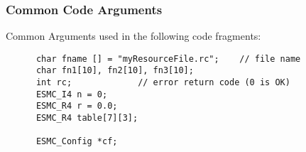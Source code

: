  
\setlength{\oldparskip}{\parskip}
\setlength{\parskip}{1.5ex}
\setlength{\oldparindent}{\parindent}
\setlength{\parindent}{0pt}
\setlength{\oldbaselineskip}{\baselineskip}
\setlength{\baselineskip}{11pt}
 
\def\bv{\begin{verbatim}}
\def\ev{\end{verbatim}}
\def\be{\begin{equation}}
\def\ee{\end{equation}}
\def\bea{\begin{eqnarray}}
\def\eea{\end{eqnarray}}
\def\bi{\begin{itemize}}
\def\ei{\end{itemize}}
\def\bn{\begin{enumerate}}
\def\en{\end{enumerate}}
\def\bd{\begin{description}}
\def\ed{\end{description}}
\def\({\left (}
\def\){\right )}
\def\[{\left [}
\def\]{\right ]}
\def\<{\left  \langle}
\def\>{\right \rangle}
\def\cI{{\cal I}}
\def\diag{\mathop{\rm diag}}
\def\tr{\mathop{\rm tr}}


 

  \subsubsection{Common Code Arguments}
 
   Common Arguments used in the following code fragments: 

 \begin{verbatim}
      char fname [] = "myResourceFile.rc";    // file name
      char fn1[10], fn2[10], fn3[10];
      int rc;             // error return code (0 is OK)
      ESMC_I4 n = 0;
      ESMC_R4 r = 0.0;
      ESMC_R4 table[7][3];

      ESMC_Config *cf;
 
\end{verbatim}
 
